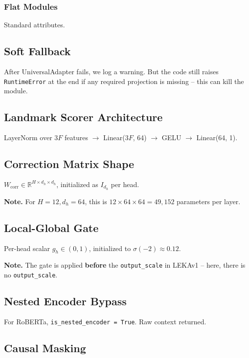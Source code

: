 \subsubsection{Flat Modules}

Standard attributes.

\subsection{Soft Fallback}

After UniversalAdapter fails, we log a warning. But the code still 
raises \texttt{RuntimeError} at the end if any required projection is missing -- 
this can kill the module.

\subsection{Landmark Scorer Architecture}

LayerNorm over $3F$ features $\to$ Linear($3F$, 64) $\to$ GELU $\to$ Linear(64, 1).

\subsection{Correction Matrix Shape}

$W_\text{corr} \in \mathbb{R}^{H \times d_h \times d_h}$, initialized 
as $I_{d_h}$ per head.

\textbf{Note.} For $H = 12, d_h = 64$, this is $12 \times 64 \times 64 = 49,152$ 
parameters per layer.

\subsection{Local-Global Gate}

Per-head scalar $g_h \in (0, 1)$, initialized to $\sigma(-2) \approx 0.12$.

\textbf{Note.} The gate is applied \textbf{before} the \texttt{output\_scale} in 
LEKAv1 -- here, there is no \texttt{output\_scale}.

\subsection{Nested Encoder Bypass}

For RoBERTa, \texttt{is\_nested\_encoder = True}. Raw context returned.

\subsection{Causal Masking}

